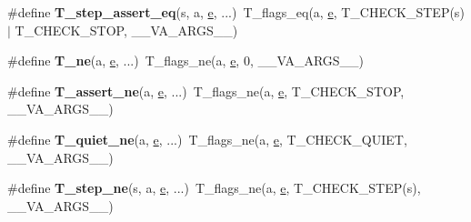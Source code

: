 \begin{DoxyCompactItemize}
\item 
\mbox{\label{group__RTEMSTestFrameworkChecksGeneric_ga9e30697b8b95427b4e33c5b5de8e5a5d}} 
\#define {\bfseries T\+\_\+step\+\_\+assert\+\_\+eq}(s,  a,  \mbox{\hyperlink{sun4u_2tte_8h_a8b0b9ed08e0e18920ec2682f48228c27}{e}}, ...)~T\+\_\+flags\+\_\+eq(a, \mbox{\hyperlink{sun4u_2tte_8h_a8b0b9ed08e0e18920ec2682f48228c27}{e}}, T\+\_\+\+C\+H\+E\+C\+K\+\_\+\+S\+T\+EP(s) $\vert$ T\+\_\+\+C\+H\+E\+C\+K\+\_\+\+S\+T\+OP, \+\_\+\+\_\+\+V\+A\+\_\+\+A\+R\+G\+S\+\_\+\+\_\+)
\item 
\mbox{\label{group__RTEMSTestFrameworkChecksGeneric_gaeac0ff9bb2f94ddeb3aa090fc5058022}} 
\#define {\bfseries T\+\_\+ne}(a,  \mbox{\hyperlink{sun4u_2tte_8h_a8b0b9ed08e0e18920ec2682f48228c27}{e}}, ...)~T\+\_\+flags\+\_\+ne(a, \mbox{\hyperlink{sun4u_2tte_8h_a8b0b9ed08e0e18920ec2682f48228c27}{e}}, 0, \+\_\+\+\_\+\+V\+A\+\_\+\+A\+R\+G\+S\+\_\+\+\_\+)
\item 
\mbox{\label{group__RTEMSTestFrameworkChecksGeneric_ga755d828688c89038b9c6d6b30982f095}} 
\#define {\bfseries T\+\_\+assert\+\_\+ne}(a,  \mbox{\hyperlink{sun4u_2tte_8h_a8b0b9ed08e0e18920ec2682f48228c27}{e}}, ...)~T\+\_\+flags\+\_\+ne(a, \mbox{\hyperlink{sun4u_2tte_8h_a8b0b9ed08e0e18920ec2682f48228c27}{e}}, T\+\_\+\+C\+H\+E\+C\+K\+\_\+\+S\+T\+OP, \+\_\+\+\_\+\+V\+A\+\_\+\+A\+R\+G\+S\+\_\+\+\_\+)
\item 
\mbox{\label{group__RTEMSTestFrameworkChecksGeneric_ga3774fab18c11d6a866a41c907e0ef67b}} 
\#define {\bfseries T\+\_\+quiet\+\_\+ne}(a,  \mbox{\hyperlink{sun4u_2tte_8h_a8b0b9ed08e0e18920ec2682f48228c27}{e}}, ...)~T\+\_\+flags\+\_\+ne(a, \mbox{\hyperlink{sun4u_2tte_8h_a8b0b9ed08e0e18920ec2682f48228c27}{e}}, T\+\_\+\+C\+H\+E\+C\+K\+\_\+\+Q\+U\+I\+ET, \+\_\+\+\_\+\+V\+A\+\_\+\+A\+R\+G\+S\+\_\+\+\_\+)
\item 
\mbox{\label{group__RTEMSTestFrameworkChecksGeneric_gaf3a0aeae4c712a4f74624cf94a45edea}} 
\#define {\bfseries T\+\_\+step\+\_\+ne}(s,  a,  \mbox{\hyperlink{sun4u_2tte_8h_a8b0b9ed08e0e18920ec2682f48228c27}{e}}, ...)~T\+\_\+flags\+\_\+ne(a, \mbox{\hyperlink{sun4u_2tte_8h_a8b0b9ed08e0e18920ec2682f48228c27}{e}}, T\+\_\+\+C\+H\+E\+C\+K\+\_\+\+S\+T\+EP(s), \+\_\+\+\_\+\+V\+A\+\_\+\+A\+R\+G\+S\+\_\+\+\_\+)

\end{DoxyCompactItemize}
